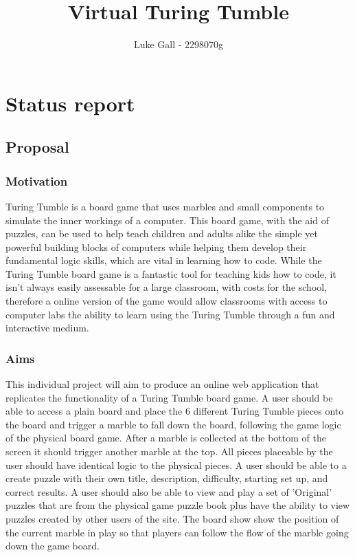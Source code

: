 \documentclass[11pt]{article}
\title{Virtual Turing Tumble}
\author{ Luke Gall - 2298070g }
\begin{document}
\maketitle




\section{Status report}

\subsection{Proposal}\label{proposal}

\subsubsection{Motivation}\label{motivation}

Turing Tumble is a board game that uses marbles and small components to simulate the inner workings of a computer. This board game, with the aid of puzzles, can be used to help teach children and adults alike the simple yet powerful building blocks of computers while helping them develop their fundamental logic skills, which are vital in learning how to code. While the Turing Tumble board game is a fantastic tool for teaching kids how to code, it isn't always easily assessable for a large classroom, with costs for the school, therefore a online version of the game would allow classrooms with access to computer labs the ability to learn using the Turing Tumble through a fun and interactive medium.

\subsubsection{Aims}\label{aims}

This individual project will aim to produce an online web application that replicates the functionality of a Turing Tumble board game. A user should be able to access a plain board and place the 6 different Turing Tumble pieces onto the board and trigger a marble to fall down the board, following the game logic of the physical board game. After a marble is collected at the bottom of the screen it should trigger another marble at the top. All pieces placeable by the user should have identical logic to the physical pieces. A user should be able to a create puzzle with their own title, description, difficulty, starting set up, and correct results. A user should also be able to view and play a set of 'Original' puzzles that are from the physical game puzzle book plus have the ability to view puzzles created by other users of the site. The board show show the position of the current marble in play so that players can follow the flow of the marble going down the game board.
\end{document}
